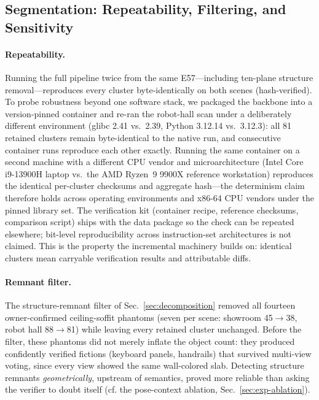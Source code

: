 \subsection{Segmentation: Repeatability, Filtering, and Sensitivity}
\label{sec:exp-seg}

\paragraph{Repeatability.}
Running the full pipeline twice from the same E57---including ten-plane
structure removal---reproduces every cluster byte-identically on both
scenes (hash-verified). To probe robustness beyond one software stack, we
packaged the backbone into a version-pinned container and re-ran the
robot-hall scan under a deliberately different environment (glibc 2.41
vs.\ 2.39, Python 3.12.14 vs.\ 3.12.3): all 81 retained clusters remain
byte-identical to the native run, and consecutive container runs
reproduce each other exactly. Running the same container on a second
machine with a different CPU vendor and microarchitecture (Intel Core
i9-13900H laptop vs.\ the AMD Ryzen~9 9900X reference workstation)
reproduces the identical per-cluster checksums and aggregate hash---the
determinism claim therefore holds across operating environments and
x86-64 CPU vendors under the pinned library set. The verification kit
(container recipe,
reference checksums, comparison script) ships with the data package so
the check can be repeated elsewhere; bit-level
reproducibility across instruction-set architectures is not claimed.
This is the property the incremental machinery
builds on: identical clusters mean carryable verification results and
attributable diffs.

\paragraph{Remnant filter.}
The structure-remnant filter of Sec.~\ref{sec:decomposition} removed all
fourteen owner-confirmed ceiling-soffit phantoms (seven per scene: showroom
45$\rightarrow$38, robot hall 88$\rightarrow$81) while leaving every retained
cluster
unchanged. Before the filter, these phantoms did not merely inflate the
object count: they produced confidently verified fictions (keyboard panels,
handrails) that survived multi-view voting, since every view showed the same
wall-colored slab. Detecting structure remnants \emph{geometrically},
upstream of semantics, proved more reliable than asking the verifier to
doubt itself (cf. the pose-context ablation, Sec.~\ref{sec:exp-ablation}).

